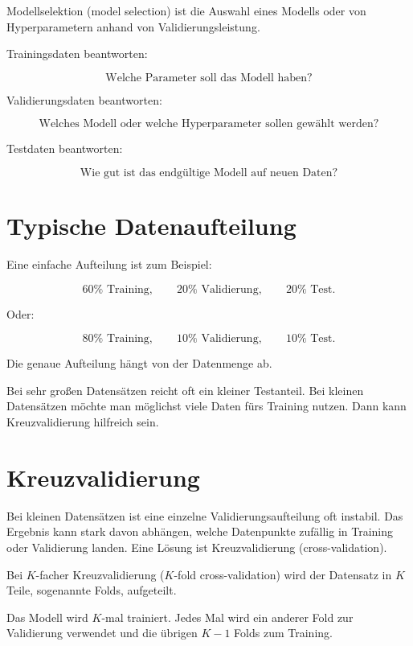\begin{definitionbox}
Modellselektion (model selection) ist die Auswahl eines Modells oder von Hyperparametern anhand von Validierungsleistung.
\end{definitionbox}

\begin{conceptbox}
Trainingsdaten beantworten:

\[
    \text{Welche Parameter soll das Modell haben?}
\]

Validierungsdaten beantworten:

\[
    \text{Welches Modell oder welche Hyperparameter sollen gewählt werden?}
\]

Testdaten beantworten:

\[
    \text{Wie gut ist das endgültige Modell auf neuen Daten?}
\]
\end{conceptbox}

\section{Typische Datenaufteilung}

Eine einfache Aufteilung ist zum Beispiel:

\[
    60\% \text{ Training},
    \qquad
    20\% \text{ Validierung},
    \qquad
    20\% \text{ Test}.
\]

Oder:

\[
    80\% \text{ Training},
    \qquad
    10\% \text{ Validierung},
    \qquad
    10\% \text{ Test}.
\]

Die genaue Aufteilung hängt von der Datenmenge ab.

\begin{notebox}
Bei sehr großen Datensätzen reicht oft ein kleiner Testanteil.
Bei kleinen Datensätzen möchte man möglichst viele Daten fürs Training nutzen.
Dann kann Kreuzvalidierung hilfreich sein.
\end{notebox}

\section{Kreuzvalidierung}

Bei kleinen Datensätzen ist eine einzelne Validierungsaufteilung oft instabil.
Das Ergebnis kann stark davon abhängen, welche Datenpunkte zufällig in Training oder Validierung landen.
Eine Lösung ist Kreuzvalidierung (cross-validation).

\begin{definitionbox}
Bei \(K\)-facher Kreuzvalidierung (\(K\)-fold cross-validation) wird der Datensatz in \(K\) Teile, sogenannte Folds, aufgeteilt.

Das Modell wird \(K\)-mal trainiert.
Jedes Mal wird ein anderer Fold zur Validierung verwendet und die übrigen \(K-1\) Folds zum Training.
\end{definitionbox}

